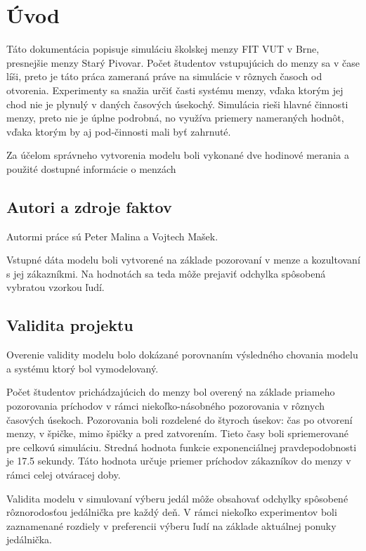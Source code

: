 \documentclass{article}
\begin{document}
\tableofcontents
\newpage
	
\section{Úvod}
Táto dokumentácia popisuje simuláciu \cite[str. 8]{ims} školskej menzy FIT VUT v Brne, presnejšie menzy Starý Pivovar. Počet študentov vstupujúcich do menzy sa v čase líši, preto je táto práca zameraná práve na simulácie v rôznych časoch od otvorenia. Experimenty sa snažia určiť časti systému menzy, vďaka ktorým jej chod nie je plynulý v daných časových úsekochý. Simulácia rieši hlavné činnosti menzy, preto nie je úplne podrobná, no využíva priemery nameraných hodnôt, vďaka ktorým by aj pod-činnosti mali byť zahrnuté.

Za účelom správneho vytvorenia modelu \cite[str. 7]{ims} boli vykonané dve hodinové merania a použité dostupné informácie o menzách \cite{menzy}

\subsection{Autori a zdroje faktov}
Autormi práce sú Peter Malina a Vojtech Mašek.

Vstupné dáta modelu boli vytvorené na základe pozorovaní v menze a kozultovaní s jej zákazníkmi. Na hodnotách sa teda môže prejaviť odchylka spôsobená vybratou vzorkou ľudí.

\subsection{Validita projektu}
Overenie validity modelu \cite[str. 37]{ims} bolo dokázané porovnaním výsledného chovania modelu \cite[str. 24]{ims} a systému \cite[str. 7]{ims} ktorý bol vymodelovaný.

Počet študentov prichádzajúcich do menzy bol overený na základe priameho pozorovania príchodov v rámci niekoľko-násobného pozorovania v rôznych časových úsekoch. Pozorovania boli rozdelené do štyroch úsekov: čas po otvorení menzy, v špičke, mimo špičky a pred zatvorením. Tieto časy boli spriemerované pre celkovú simuláciu. Stredná hodnota funkcie exponenciálnej pravdepodobnosti \cite[str. 91]{ims} je 17.5 sekundy. Táto hodnota určuje priemer príchodov zákazníkov do menzy v rámci celej otváracej doby.

Validita modelu v simulovaní výberu jedál môže obsahovať odchylky spôsobené rôznorodosťou jedálnička pre každý deň. V rámci niekoľko experimentov boli zaznamenané rozdiely v preferencii výberu ľudí na základe aktuálnej ponuky jedálnička.
\end{document}

